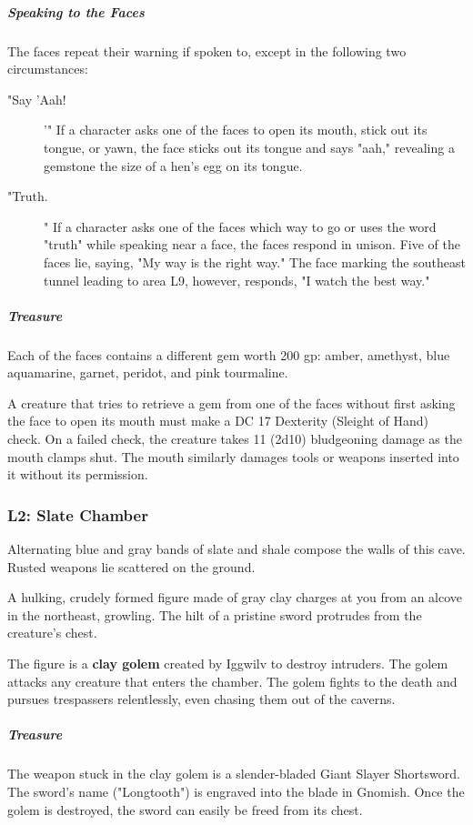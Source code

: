 \documentclass[10pt,a4paper,twoside,bg=print,twocolumn,openany,nodeprecatedcode]{dndbook}
\begin{document}
\subparagraph{Speaking to the Faces}
The faces repeat their warning if spoken to, except in the following two circumstances:


\begin{description}
\item["Say 'Aah!]
'" If a character asks one of the faces to open its mouth, stick out its tongue, or yawn, the face sticks out its tongue and says "aah," revealing a gemstone the size of a hen's egg on its tongue.
\item["Truth.]
" If a character asks one of the faces which way to go or uses the word "truth" while speaking near a face, the faces respond in unison. Five of the faces lie, saying, "My way is the right way." The face marking the southeast tunnel leading to area L9, however, responds, "I watch the best way."
\end{description}

\subparagraph{Treasure}
Each of the faces contains a different gem worth 200 gp: amber, amethyst, blue aquamarine, garnet, peridot, and pink tourmaline.

A creature that tries to retrieve a gem from one of the faces without first asking the face to open its mouth must make a DC 17 Dexterity (Sleight of Hand) check. On a failed check, the creature takes 11 (2d10) bludgeoning damage as the mouth clamps shut. The mouth similarly damages tools or weapons inserted into it without its permission.

\subsubsection{L2: Slate Chamber}
\begin{DndReadAloud}{}
Alternating blue and gray bands of slate and shale compose the walls of this cave. Rusted weapons lie scattered on the ground.

A hulking, crudely formed figure made of gray clay charges at you from an alcove in the northeast, growling. The hilt of a pristine sword protrudes from the creature's chest.

\end{DndReadAloud}

The figure is a \textbf{clay golem} created by Iggwilv to destroy intruders. The golem attacks any creature that enters the chamber. The golem fights to the death and pursues trespassers relentlessly, even chasing them out of the caverns.

\subparagraph{Treasure}
The weapon stuck in the clay golem is a slender-bladed Giant Slayer Shortsword. The sword's name ("Longtooth") is engraved into the blade in Gnomish. Once the golem is destroyed, the sword can easily be freed from its chest.
\end{document}
